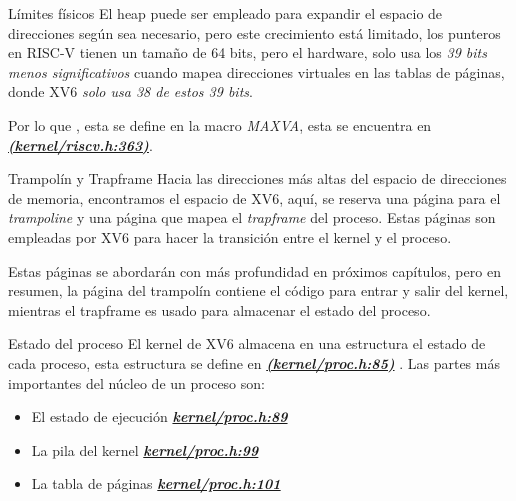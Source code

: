\documentclass{libs/ufc_format}
\begin{document}
\begin{frame}{Límites físicos}
    El heap puede ser empleado para expandir el espacio de direcciones según sea necesario, pero este crecimiento está limitado, los punteros en RISC-V tienen un tamaño de 64 bits, pero el hardware, solo usa los \emph{39 bits menos significativos} cuando mapea direcciones virtuales en las tablas de páginas, donde XV6 \emph{solo usa 38 de estos 39 bits}.
    
    \vspace{0.2cm}

    Por lo que , esta se define en la macro \textit{\emph{MAXVA}}, esta se encuentra en \href{https://github.com/CarlosSandoval-03/xv6-riscv/blob/riscv/kernel/riscv.h\#L363}{\textit{\textbf{(kernel/riscv.h:363)}}}. \cite{xv6}
\end{frame}
\begin{frame}{Trampolín y Trapframe}
    Hacia las direcciones más altas del espacio de direcciones de memoria, encontramos el espacio de XV6, aquí, se reserva una página para el \textit{\emph{trampoline}} y una página que mapea el \textit{\emph{trapframe}} del proceso. Estas páginas son empleadas por XV6 para hacer la transición entre el kernel y el proceso.

    \vspace{0.3cm}

    Estas páginas se abordarán con más profundidad en próximos capítulos, pero en resumen, la página del trampolín contiene el código para entrar y salir del kernel, mientras el trapframe es usado para almacenar el estado del proceso. \cite{stackoverflow:Trapframe}
\end{frame}
\begin{frame}{Estado del proceso}
    El kernel de XV6 almacena en una estructura el estado de cada proceso, esta estructura se define en \href{https://github.com/CarlosSandoval-03/xv6-riscv/blob/riscv/kernel/proc.h\#L85}{\textit{\textbf{(kernel/proc.h:85)}}} \cite{xv6}. Las partes más importantes del núcleo de un proceso son:

    \begin{itemize}
        \item El estado de ejecución \href{https://github.com/CarlosSandoval-03/xv6-riscv/blob/riscv/kernel/proc.h\#L89}{\textit{\textbf{kernel/proc.h:89}}}
        \item La pila del kernel \href{https://github.com/CarlosSandoval-03/xv6-riscv/blob/riscv/kernel/proc.h\#L99}{\textit{\textbf{kernel/proc.h:99}}}
        \item La tabla de páginas \href{https://github.com/CarlosSandoval-03/xv6-riscv/blob/riscv/kernel/proc.h\#L101}{\textit{\textbf{kernel/proc.h:101}}}
    \end{itemize}
\end{frame}
\end{document}

